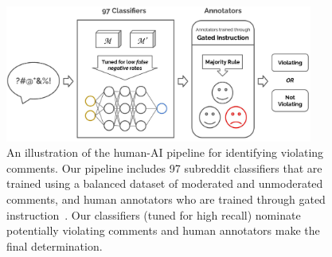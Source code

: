 

\begin{figure}[tb]
  \centering
  \includegraphics[width=0.90\textwidth]{content_minor_revision__Apr2022/images/Final_pipeline.jpg}
  \caption{An illustration of the human-AI pipeline for identifying violating comments. Our pipeline includes 97 subreddit classifiers that are trained using a balanced dataset of moderated and unmoderated comments, and human annotators who are trained through gated instruction~\cite{25_Liu}. Our classifiers (tuned for high recall) nominate potentially violating comments and human annotators make the final determination.}
\end{figure}


